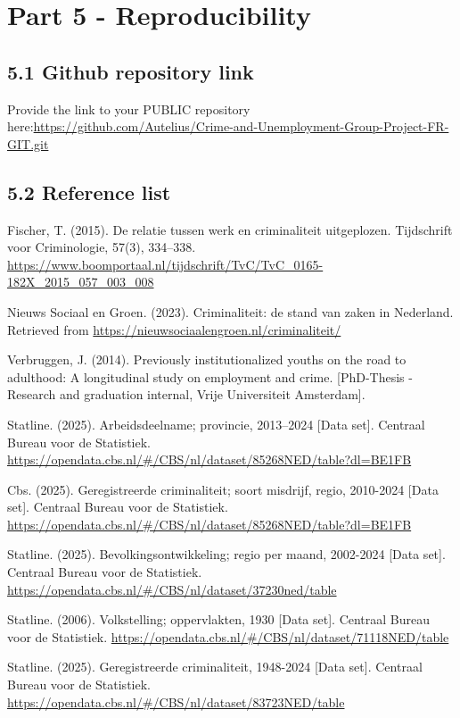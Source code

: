 \documentclass[
]{article}
\begin{document}
\section{Part 5 - Reproducibility}\label{part-5---reproducibility}

\subsection{5.1 Github repository link}\label{github-repository-link}

Provide the link to your PUBLIC repository
here:\url{https://github.com/Autelius/Crime-and-Unemployment-Group-Project-FR-GIT.git}

\subsection{5.2 Reference list}\label{reference-list}

Fischer, T. (2015). De relatie tussen werk en criminaliteit uitgeplozen.
Tijdschrift voor Criminologie, 57(3), 334--338.
\url{https://www.boomportaal.nl/tijdschrift/TvC/TvC_0165-182X_2015_057_003_008}

Nieuws Sociaal en Groen. (2023). Criminaliteit: de stand van zaken in
Nederland. Retrieved from
\url{https://nieuwsociaalengroen.nl/criminaliteit/}

Verbruggen, J. (2014). Previously institutionalized youths on the road
to adulthood: A longitudinal study on employment and crime.
{[}PhD-Thesis - Research and graduation internal, Vrije Universiteit
Amsterdam{]}.

Statline. (2025). Arbeidsdeelname; provincie, 2013--2024 {[}Data set{]}.
Centraal Bureau voor de Statistiek.
\url{https://opendata.cbs.nl/\#/CBS/nl/dataset/85268NED/table?dl=BE1FB}

Cbs. (2025). Geregistreerde criminaliteit; soort misdrijf, regio,
2010-2024 {[}Data set{]}. Centraal Bureau voor de Statistiek.
\url{https://opendata.cbs.nl/\#/CBS/nl/dataset/85268NED/table?dl=BE1FB}

Statline. (2025). Bevolkingsontwikkeling; regio per maand, 2002-2024
{[}Data set{]}. Centraal Bureau voor de Statistiek.
\url{https://opendata.cbs.nl/\#/CBS/nl/dataset/37230ned/table}

Statline. (2006). Volkstelling; oppervlakten, 1930 {[}Data set{]}.
Centraal Bureau voor de Statistiek.
\url{https://opendata.cbs.nl/\#/CBS/nl/dataset/71118NED/table}

Statline. (2025). Geregistreerde criminaliteit, 1948-2024 {[}Data
set{]}. Centraal Bureau voor de Statistiek.
\url{https://opendata.cbs.nl/\#/CBS/nl/dataset/83723NED/table}
\end{document}
